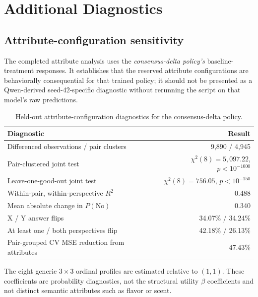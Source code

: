 \documentclass[11pt,letterpaper]{article}
\begin{document}
\section{Additional Diagnostics}

\subsection{Attribute-configuration sensitivity}

The completed attribute analysis uses the \emph{consensus-delta policy's}
baseline-treatment responses. It establishes that the reserved attribute
configurations are behaviorally consequential for that trained policy; it
should not be presented as a Qwen-derived seed-42-specific diagnostic without
rerunning the script on that model's raw predictions.

\begin{table}[htbp]
\centering
\small
\begin{tabular}{p{}r}
\toprule
Diagnostic & Result \\
\midrule
Differenced observations / pair clusters & 9,890 / 4,945 \\
Pair-clustered joint test & $\chi^2(8)=5{,}097.22$, $p<10^{-1000}$ \\
Leave-one-good-out joint test & $\chi^2(8)=756.05$, $p<10^{-150}$ \\
Within-pair, within-perspective $R^2$ & 0.488 \\
Mean absolute change in $P(\mathrm{No})$ & 0.340 \\
X / Y answer flips & 34.07\% / 34.24\% \\
At least one / both perspectives flip & 42.18\% / 26.13\% \\
Pair-grouped CV MSE reduction from attributes & 47.43\% \\
\bottomrule
\end{tabular}
\caption{Held-out attribute-configuration diagnostics for the consensus-delta
policy.}
\label{tab:attribute-summary}
\end{table}

The eight generic $3\times3$ ordinal profiles are estimated relative to
$(1,1)$. These coefficients are probability diagnostics, not the structural
utility $\beta$ coefficients and not distinct semantic attributes such as
flavor or scent.
\end{document}
